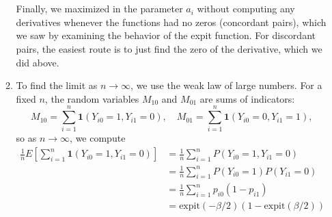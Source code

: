 \documentclass[11pt]{article}
\begin{document}
\begin{enumerate}
\begin{enumerate}
			 \\ \\Finally, we maximized in the parameter $a_i$ without computing any derivatives whenever the functions had no zeros (concordant pairs), which we saw by examining the behavior of the expit function. For discordant pairs, the easiest route is to just find the zero of the derivative, which we did above. 
			\item To find the limit as $n\to\infty$, we use the weak law of large numbers. For a fixed $n$, the random variables $M_{10}$ and $M_{01}$ are sums of indicators:
			\[
				M_{10} = \sum_{i=1}^n \bm{1}(Y_{i0}=1, Y_{i1}=0), \quad M_{01} = \sum_{i=1}^n \bm{1}(Y_{i0}=0, Y_{i1}=1),
			\]
			so as $n\to\infty$, we compute
			\begin{align*}
				\frac{1}{n}E[\sum_{i=1}^n \bm{1}(Y_{i0}=1, Y_{i1}=0)] &= \frac{1}{n}\sum_{i=1}^n P(Y_{i0}=1, Y_{i1}=0) \\
				&= \frac{1}{n}\sum_{i=1}^nP(Y_{i0}=1)P(Y_{i1}=0) \\
				&= \frac{1}{n}\sum_{i=1}^n p_{i0}(1-p_{i1}) \\
				&= \mathrm{expit}(-\beta/2)(1-\mathrm{expit}(\beta/2)) \\

\end{align*}
\end{enumerate}
\end{enumerate}
\end{document}
